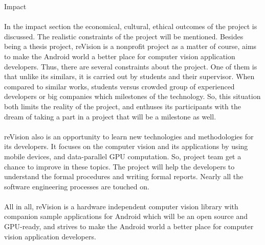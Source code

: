 \documentclass[12pt, a4paper]{article} \pagenumbering{gobble}
\begin{document}
\newpage

\begin{section}{Impact}

\paragraph{}{
In the impact section the economical, cultural, ethical outcomes of the project is
discussed. The realistic constraints of the project will be mentioned. Besides being a thesis project,
reVision is a nonprofit project as a matter of course, aims to make the Android world a better place for computer vision
application developers. Thus, there are several constraints about the project. One of them is that
unlike its similars, it is carried out by students and their supervisor. When compared to similar works,
students versus crowded group of experienced developers or big companies which milestones of the technology.
So, this situation both limits the reality of the project, and enthuses its participants with the dream of
taking a part in a project that will be a milestone as well.

}

\paragraph{}{
  reVision also is an opportunity to learn new technologies and methodologies for its developers. It focuses on the
  computer vision and its applications by using mobile devices, and data-parallel GPU computation. So, project team
  get a chance to improve in these topics. The project will help the developers to understand the formal procedures
  and writing formal reports. Nearly all the software engineering processes are touched on.
}

\paragraph{}{
  All in all,  reVision is a hardware independent computer vision library with companion sample applications
  for Android which will be an open source and GPU-ready, and strives to make the Android world a better
  place for computer vision application developers.

}

\end{section}
\end{document}
